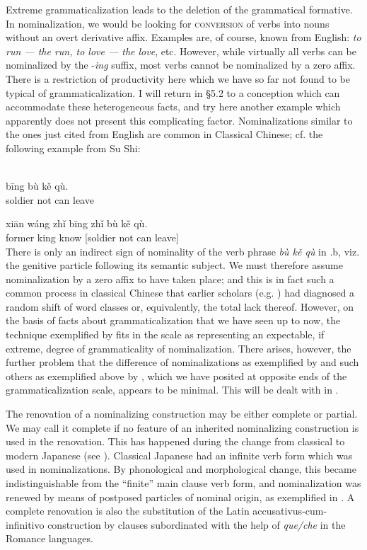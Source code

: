 Extreme grammaticalization leads to the deletion of the grammatical formative. In nominalization, we would be looking for \textsc{conversion} of verbs into nouns without an overt derivative affix. Examples are, of course, known from English: \textit{to run — the run, to love — the love}, etc. However, while virtually all verbs can be nominalized by the -\textit{ing} suffix, most verbs cannot be nominalized by a zero affix. There is a restriction of productivity here which we have so far not found to be typical of grammaticalization. I will return in §5.2 to a conception which can accommodate these heterogeneous facts, and try here another example which apparently does not present this complicating factor. Nominalizations similar to the ones just cited from English are common in Classical Chinese; cf. the following example from Su Shi:

\ea\label{ex:E31}
\\
 \ea
 \gll b\=ing  bù  kě  qù.\\
 soldier  not  can  leave\\

\ex
\gll xi\=an  wáng  zh\v{i}  b\=ing  zh\v{i}  bù  kě  qù.\\
   former  king  know  [soldier  {\glgen}  not  can  leave]\\
\z
\z
\noindent There is only an indirect sign of nominality of the verb phrase \textit{bù kě qù} in .b, viz. the genitive particle following its semantic subject. We must therefore assume nominalization by a zero affix to have taken place; and this is in fact such a common process in classical Chinese that earlier scholars (e.g. \citealt{Misteli1893}) had diagnosed a random shift of word classes or, equivalently, the total lack thereof. However, on the basis of facts about grammaticalization that we have seen up to now, the technique exemplified by  fits in the scale as representing an expectable, if extreme, degree of grammaticality of nominalization. There arises, however, the further problem that the difference of nominalizations as exemplified by  and such others as exemplified above by , which we have posited at opposite ends of the grammaticalization scale, appears to be minimal. This will be dealt with in .

The renovation of a nominalizing construction may be either complete or partial. We may call it complete if no feature of an inherited nominalizing construction is used in the renovation. This has happened during the change from classical to modern Japanese (see \citealt[45f]{Bossong1979}). Classical Japanese had an infinite verb form which was used in nominalizations. By phonological and morphological change, this became indistinguishable from the “finite” main clause verb form, and nominalization was renewed by means of postposed particles of nominal origin, as exemplified in . A complete renovation is also the substitution of the Latin accusativus-cum-infinitivo construction by clauses subordinated with the help of \textit{que/che} in the Romance languages.

